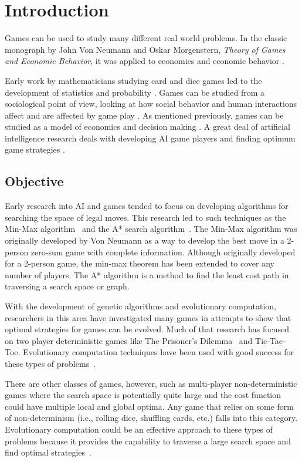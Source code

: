 \clearpage
\chapter{Introduction}\label{chap:intro}
Games can be used to study many different real world problems. In the
classic monograph by John Von Neumann and Oskar Morgenstern, \emph{Theory of
Games and Economic Behavior}, it was applied to economics and economic behavior
\cite{neumann1944theory}.

Early work by mathematicians studying card and dice games led to the development
of statistics and probability \cite{hald1990history,rudas2008handbook}. Games
can be studied from a sociological point of view, looking at how social behavior
and human interactions affect and are affected by game play
\cite{fararo1992meaning}. As mentioned previously, games can be studied as a
model of economics and decision making \cite{neumann1944theory}. A great deal of
artificial intelligence research deals with developing AI game players and
finding optimum game strategies \cite{russell2010artificial}.

\section{Objective}

Early research into AI and games tended to focus on developing algorithms for
searching the space of legal moves. This research led to such techniques as the
Min-Max algorithm~\cite{neumann1944theory} and the A* search
algorithm~\cite{Hart_Nilsson_Raphael_1968,Hart:1972:LFB:1056777.1056779}. The
Min-Max algorithm was originally developed by Von Neumann as a way to develop
the best move in a 2-person zero-sum game with complete information. Although
originally developed for a 2-person game, the min-max theorem has been extended
to cover any number of players. The A* algorithm is a method to find the least
cost path in traversing a search space or graph.

With the development of genetic algorithms and evolutionary computation,
re\-search\-ers in this area have investigated many games in attempts to show
that optimal strategies for games can be evolved. Much of that research has
focused on two player deterministic games like The Prisoner's
Dilemma~\cite{Flood1958} and Tic-Tac-Toe. Evolutionary computation techniques
have been used with good success for these types of
problems~\cite{DBLP:conf/cig/QuekG07,Fogel1993}.

There are other classes of games, however, such as multi-player
non-deterministic games where the search space is potentially quite large and
the cost function could have multiple local and global optima. Any game that
relies on some form of non-determinism (i.e., rolling dice, shuffling cards,
etc.) falls into this category. Evolutionary computation could be an effective
approach to these types of problems because it provides the capability to
traverse a large search space and find optimal
strategies~\cite{Quek_GAPoker,Foster1990219,eriksson2001evolution}.

